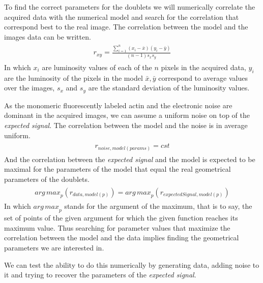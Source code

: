 \documentclass[A4paperpaper,11pt,english]{sphinxmanual}
\begin{document}
To find the correct parameters for the doublets we will numerically correlate
the acquired data with the numerical model and search for the correlation
that correspond best to the real image. The correlation between the model and the images
data can be written.
\label{index-latex:equation-eqa402}\begin{gather}
\begin{split}r_{xy}=\frac{\sum\limits_{i=1}^n (x_i-\bar{x})(y_i-\bar{y})}{(n-1) s_x s_y}\end{split}\label{index-latex-eqa402}
\end{gather}
In which \(x_i\) are luminosity values of each of the \(n\) pixels in
the acquired data, \(y_i\) are the luminosity of the pixels in the model
\(\bar{x},\bar{y}\) correspond to average values over the images,
\(s_x\) and \(s_y\) are the standard deviation of the luminosity
values.

As the monomeric fluorescently labeled actin and the electronic noise are dominant
in the acquired images, we can assume a uniform noise on top of the \emph{expected signal}. The correlation between the model and the noise is in average
uniform.
\label{index-latex:equation-eqa403}\begin{gather}
\begin{split}r_{noise,model(params)} = cst\end{split}\label{index-latex-eqa403}
\end{gather}
And the correlation between the \emph{expected signal} and the model is expected to be
maximal for the parameters of the model that  equal the real geometrical
parameters of the doublets.
\label{index-latex:equation-eqa404}\begin{gather}
\begin{split}{arg\,max}_p\left(r_{data,model(p)}\right)= {arg\,max}_p \left(r_{expectedSignal,model(p)}\right)\end{split}\label{index-latex-eqa404}
\end{gather}
In which \({arg\,max}_p\) stands for the
argument of the maximum, that is to say, the set of points of the given
argument for which the given function reaches its maximum value. Thus searching
for parameter values that maximize the correlation between the model and
the data implies finding the geometrical parameters we are interested in.

We can test the ability to do this numerically by generating data, adding noise
to it and trying to recover the parameters of the \emph{expected signal}.
\end{document}
